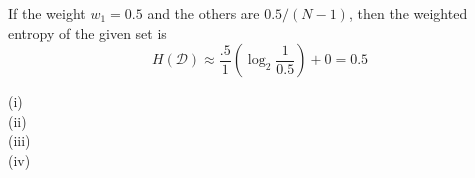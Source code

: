 \documentclass[solution, letterpaper]{cs121}
\begin{document}
If the weight $w_1 = 0.5$ and the others are $0.5/(N-1)$, then the weighted entropy of the given set is
\[ H(\mathcal D) \approx \frac{.5}{1} (\log_2 \frac{1}{0.5}) + 0 = 0.5 \]

\subproblem

(i) \\

(ii) \\

(iii) \\

(iv) \\
\end{document}
